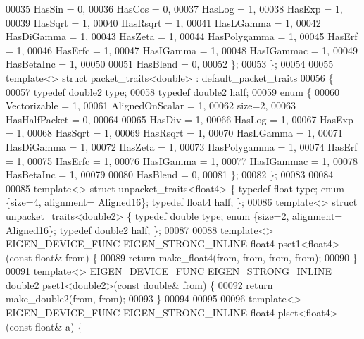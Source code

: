 \begin{DoxyCode}
00035     HasSin  = 0,
00036     HasCos  = 0,
00037     HasLog  = 1,
00038     HasExp  = 1,
00039     HasSqrt = 1,
00040     HasRsqrt = 1,
00041     HasLGamma = 1,
00042     HasDiGamma = 1,
00043     HasZeta = 1,
00044     HasPolygamma = 1,
00045     HasErf = 1,
00046     HasErfc = 1,
00047     HasIGamma = 1,
00048     HasIGammac = 1,
00049     HasBetaInc = 1,
00050 
00051     HasBlend = 0,
00052   \};
00053 \};
00054 
00055 \textcolor{keyword}{template}<> \textcolor{keyword}{struct }packet\_traits<double> : default\_packet\_traits
00056 \{
00057   \textcolor{keyword}{typedef} double2 type;
00058   \textcolor{keyword}{typedef} double2 half;
00059   \textcolor{keyword}{enum} \{
00060     Vectorizable = 1,
00061     AlignedOnScalar = 1,
00062     size=2,
00063     HasHalfPacket = 0,
00064 
00065     HasDiv  = 1,
00066     HasLog  = 1,
00067     HasExp  = 1,
00068     HasSqrt = 1,
00069     HasRsqrt = 1,
00070     HasLGamma = 1,
00071     HasDiGamma = 1,
00072     HasZeta = 1,
00073     HasPolygamma = 1,
00074     HasErf = 1,
00075     HasErfc = 1,
00076     HasIGamma = 1,
00077     HasIGammac = 1,
00078     HasBetaInc = 1,
00079 
00080     HasBlend = 0,
00081   \};
00082 \};
00083 
00084 
00085 \textcolor{keyword}{template}<> \textcolor{keyword}{struct }unpacket\_traits<float4>  \{ \textcolor{keyword}{typedef} \textcolor{keywordtype}{float}  type; \textcolor{keyword}{enum} \{size=4, alignment=
      \hyperlink{group__enums_gga45fe06e29902b7a2773de05ba27b47a1af8e2bf74b04c02199f62c5e3c06dbfcc}{Aligned16}\}; \textcolor{keyword}{typedef} float4 half; \};
00086 \textcolor{keyword}{template}<> \textcolor{keyword}{struct }unpacket\_traits<double2> \{ \textcolor{keyword}{typedef} \textcolor{keywordtype}{double} type; \textcolor{keyword}{enum} \{size=2, alignment=
      \hyperlink{group__enums_gga45fe06e29902b7a2773de05ba27b47a1af8e2bf74b04c02199f62c5e3c06dbfcc}{Aligned16}\}; \textcolor{keyword}{typedef} double2 half; \};
00087 
00088 \textcolor{keyword}{template}<> EIGEN\_DEVICE\_FUNC EIGEN\_STRONG\_INLINE float4 pset1<float4>(\textcolor{keyword}{const} \textcolor{keywordtype}{float}&  from) \{
00089   \textcolor{keywordflow}{return} make\_float4(from, from, from, from);
00090 \}
00091 \textcolor{keyword}{template}<> EIGEN\_DEVICE\_FUNC EIGEN\_STRONG\_INLINE double2 pset1<double2>(\textcolor{keyword}{const} \textcolor{keywordtype}{double}& from) \{
00092   \textcolor{keywordflow}{return} make\_double2(from, from);
00093 \}
00094 
00095 
00096 \textcolor{keyword}{template}<> EIGEN\_DEVICE\_FUNC EIGEN\_STRONG\_INLINE float4 plset<float4>(\textcolor{keyword}{const} \textcolor{keywordtype}{float}& a) \{

\end{DoxyCode}
